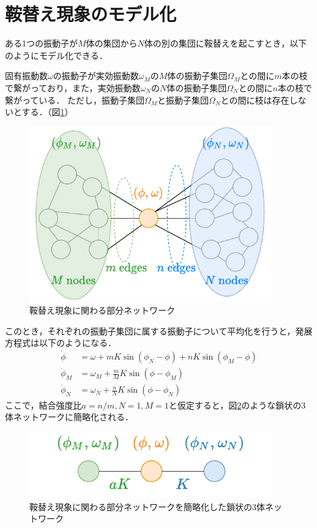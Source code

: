 \documentclass[../main]{subfiles}
\begin{document}
\section{鞍替え現象のモデル化}
ある1つの振動子が$M$体の集団から$N$体の別の集団に鞍替えを起こすとき，以下のようにモデル化できる．
\begin{screen}
固有振動数$\omega$の振動子が実効振動数$\omega_M$の$M$体の振動子集団$\Omega_M$との間に$m$本の枝で繋がっており，また，実効振動数$\omega_N$の$N$体の振動子集団$\Omega_N$との間に$n$本の枝で繋がっている．
ただし，振動子集団$\Omega_M$と振動子集団$\Omega_N$との間に枝は存在しないとする．（図\ref{fig:switch}）
\end{screen}
\begin{figure}[t]
\centering
\includegraphics[width=105mm]{./images/three_obj_before.pdf}
\centering
\caption{鞍替え現象に関わる部分ネットワーク}
\label{fig:switch}
\end{figure}
このとき，それぞれの振動子集団に属する振動子について平均化を行うと，発展方程式は以下のようになる．
\begin{align*}
    \dot{\phi}&=\omega+mK\sin\left( \phi_N-\phi \right)+nK\sin\left( \phi_M-\phi \right)\\
    \dot{\phi}_M&=\omega_M+\frac{m}{M}K\sin\left( \phi-\phi_M \right) \\
    \dot{\phi}_N&=\omega_N+\frac{n}{N}K\sin\left( \phi-\phi_N \right)    
\end{align*}
ここで，結合強度比$a=n/m,N=1,M=1$と仮定すると，図\ref{fig:3body}のような鎖状の3体ネットワークに簡略化される．
\begin{figure}[t]
\centering
\includegraphics[width=105mm]{./images/three_obj_after.pdf}
\centering
\caption{鞍替え現象に関わる部分ネットワークを簡略化した鎖状の3体ネットワーク}
\label{fig:3body}
\end{figure}
\end{document}
